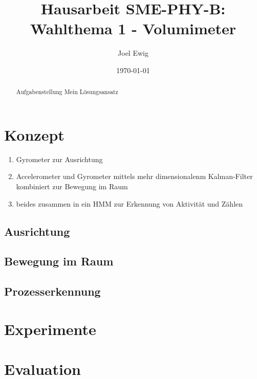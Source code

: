 \documentclass{article}
\begin{document}
\title{Hausarbeit SME-PHY-B: Wahlthema 1 - Volumimeter}
\author{Joel Ewig}
\date{\today}
\maketitle
\clearpage

\begin{abstract}
Aufgabenstellung
Mein Lösungsansatz
\end{abstract}
\clearpage

\tableofcontents
\clearpage


\section{Konzept}
\begin{enumerate}
\item Gyrometer zur Ausrichtung
\item Accelerometer und Gyrometer mittels mehr dimensionalenm Kalman-Filter kombiniert zur Bewegung im Raum
\item beides zusammen in ein HMM zur Erkennung von Aktivität und Zählen
\end{enumerate}
\subsection{Ausrichtung}
\subsection{Bewegung im Raum}
\subsection{Prozesserkennung}

\section{Experimente}
\section{Evaluation}
\end{document}
